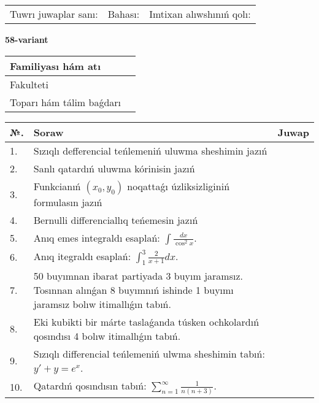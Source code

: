 \documentclass{article}
\begin{document}
\vspace{1cm}

\begin{tabular}{ c c c }
Tuwrı juwaplar sanı: \underline{\hspace{2cm}} & Bahası: \underline{\hspace{2cm}} & Imtixan alıwshınıń qolı: \underline{\hspace{2cm}} \\
\end{tabular}

\newpage

\begin{center}\textbf{58-variant}\end{center}

\bgroup
\def\arraystretch{1.5}
\begin{tabular}{ |m{6cm}|m{10cm}| }
  \hline
  Familiyası hám atı & \\
  \hline
  Fakulteti &\\
  \hline
  Toparı hám tálim baǵdarı & \\
  \hline
\end{tabular}
\egroup

\vspace{0.5cm}

\bgroup
\def\arraystretch{2}
\begin{tabular}{ |l|m{8cm}|m{7cm}| }
  \hline
  №. & Soraw & Juwap \\
  \hline
  1. & Sızıqlı defferencial teńlemeniń uluwma sheshimin jazıń &  \\
  \hline
  2. & Sanlı qatardıń uluwma kórinisin jazıń &  \\
  \hline
  3. & Funkcianıń $(x_{0}, y_{0})$ noqattaǵı úzliksizliginiń formulasın jazıń &  \\
  \hline
  4. & Bernulli differenciallıq teńemesin jazıń &  \\
  \hline
  5. & Anıq emes integraldı esaplań: $\displaystyle\int \frac{dx}{\cos^{2}x}$. &  \\
  \hline
  6. & Anıq itegraldı esaplań: $\displaystyle\int_{1}^{3}{\frac{2}{x + 1}dx}$. &  \\
  \hline
  7. & 50 buyımnan ibarat partiyada 3 buyım jaramsız. Tosınnan alınǵan 8 buyımnıń ishinde 1 buyımı jaramsız bolıw itimallıǵın tabıń. &  \\
  \hline
  8. & Eki kubikti bir márte taslaǵanda túsken ochkolardıń qosındısı 4 bolıw itimallıǵın tabıń. &  \\
  \hline
  9. & Sızıqlı differencial teńlemeniń ulwma sheshimin tabıń: $y' + y =e^{x}$. &  \\
  \hline
  10. & Qatardıń qosındısın tabıń: $\displaystyle\sum_{n = 1}^{\infty}\frac{1}{n(n + 3)}$. &  \\
  \hline
\end{tabular}
\egroup
\end{document}
